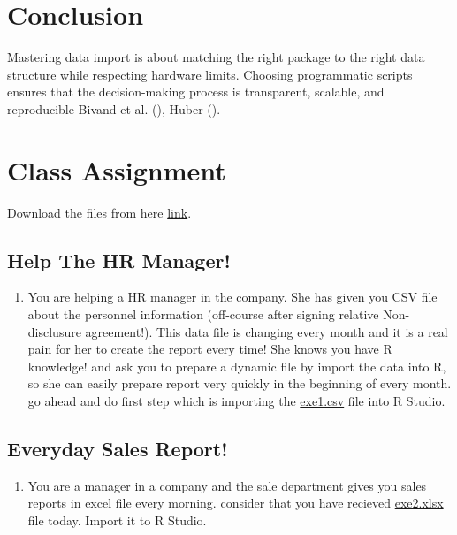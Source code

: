 \documentclass[
  doc,
  longtable,
  a4paper,
  nolmodern,
  notxfonts,
  notimes,
  colorlinks=true,linkcolor=blue,citecolor=blue,urlcolor=blue]{apa7}
\providecommand{\tightlist}{%
  \setlength{\itemsep}{0pt}\setlength{\parskip}{0pt}}
\begin{document}
\section{Conclusion}\label{conclusion}

Mastering data import is about matching the right package to the right
data structure while respecting hardware limits. Choosing programmatic
scripts ensures that the decision-making process is transparent,
scalable, and reproducible Bivand et al.
(), Huber
().

\section{Class Assignment}\label{class-assignment}

Download the files from here
\href{https://drive.google.com/file/d/17co85tSnV84tRCVxreNODKs_2N6F92Xc/view?usp=sharing}{link}.

\subsection{Help The HR Manager!}\label{help-the-hr-manager}

\begin{enumerate}
\def\labelenumi{\arabic{enumi}.}
\tightlist
\item
  You are helping a HR manager in the company. She has given you CSV
  file about the personnel information (off-course after signing
  relative Non-disclusure agreement!). This data file is changing every
  month and it is a real pain for her to create the report every time!
  She knows you have R knowledge! and ask you to prepare a dynamic file
  by import the data into R, so she can easily prepare report very
  quickly in the beginning of every month. go ahead and do first step
  which is importing the \url{exe1.csv} file into R Studio.
\end{enumerate}

\subsection{Everyday Sales Report!}\label{everyday-sales-report}

\begin{enumerate}
\def\labelenumi{\arabic{enumi}.}
\setcounter{enumi}{1}
\tightlist
\item
  You are a manager in a company and the sale department gives you sales
  reports in excel file every morning. consider that you have recieved
  \url{exe2.xlsx} file today. Import it to R Studio.
\end{enumerate}
\end{document}
